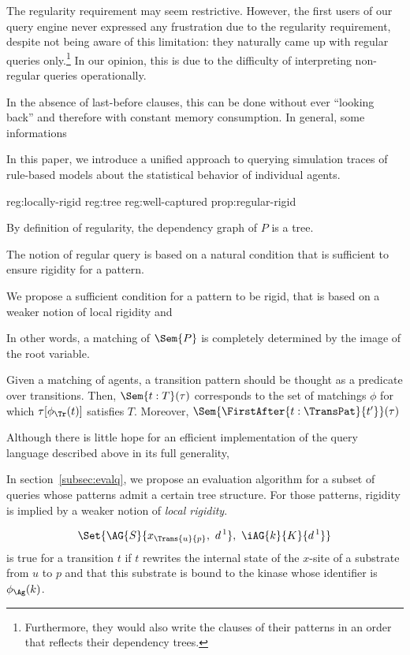 
The regularity requirement may seem restrictive. However, the first
users of our query engine never expressed any frustration due to the
regularity requirement, despite not being aware of this limitation:
they naturally came up with regular queries
only.\footnote{Furthermore, they would also write the clauses of their
  patterns in an order that reflects their dependency trees.}  In our
opinion, this is due to the difficulty of interpreting non-regular
queries operationally.


\label{subsec:tpats-language}

In the absence of \textsf{last-before} clauses, this can be done
without ever ``looking back'' and therefore with constant memory
consumption. In general, some informations

 In this paper, we introduce a unified approach to querying
  simulation traces of rule-based models about the statistical
  behavior of individual agents.

{reg:locally-rigid}
{reg:tree}
{reg:well-captured}
{prop:regular-rigid}

By definition of regularity,
the dependency graph of $P$ is a tree.

The notion of regular query is based on a natural condition that is
sufficient to ensure rigidity for a pattern.

We propose a sufficient condition for a pattern to be rigid, that is based
on a weaker notion of local rigidity and


In other words, a matching of $\Sem{P}$ is completely determined by
the image of the root variable.


Given a matching of agents, a transition pattern should be thought as
a predicate over transitions. Then, $\Sem{t:T}(\tau)$ corresponds to
the set of matchings $\phi$ for which $\tau[\phi_{\Tr}(t)]$ satisfies
$T$. Moreover, $\Sem{\FirstAfter{t:\TransPat}{t'}}(\tau)$

Although there is little hope for an efficient implementation of the
query language described above in its full generality, 

In section~\ref{subsec:evalq}, we propose an evaluation algorithm for
a subset of queries whose patterns admit a certain tree structure. For
those patterns, rigidity is implied by a weaker notion of \emph{local
  rigidity}.

\[ \Set{ \AG{S}{x_{\Trans{u}{p}},\ d^{\,1}},\ \iAG{k}{K}{d^{\,1}} } \]
is true for a transition $t$ if $t$ rewrites the internal state of the
$x$-site of a substrate from $u$ to $p$ and that this substrate is
bound to the kinase whose identifier is $\phi_{\Ag}(k)$.

